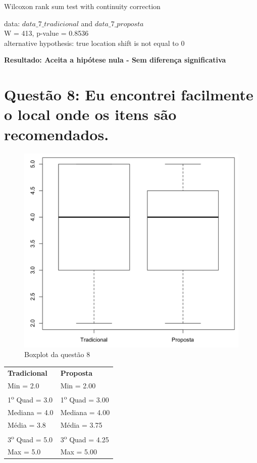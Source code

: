 Wilcoxon rank sum test with continuity correction

\noindent
data:  $data\_7\_tradicional$ and $data\_7\_proposta$\\
W = 413, p-value = 0.8536\\
alternative hypothesis: true location shift is not equal to 0

\noindent
\textbf{Resultado: Aceita a hipótese nula - Sem diferença significativa}

\newpage
\section{Questão 8: Eu encontrei facilmente o local onde os itens são recomendados.}

\begin{figure}[htb]
  \caption{\label{fig:questao8-boxplot}Boxplot da questão 8}
  \begin{center}
      \includegraphics[scale=0.4]{./Figuras/questao8-boxplot.png}
  \end{center}
\end{figure}

\begin{table}[h]
\begin{tabular}{p{}p{}}
\textbf{Tradicional} & \textbf{Proposta} \\
Min = 2.0 & Min = 2.00\\
1\textsuperscript{o} Quad = 3.0 & 1\textsuperscript{o} Quad = 3.00\\
Mediana = 4.0 & Mediana = 4.00\\
Média = 3.8 & Média = 3.75\\
3\textsuperscript{o} Quad = 5.0 & 3\textsuperscript{o} Quad = 4.25\\
Max = 5.0 & Max = 5.00\\
\end{tabular}
\end{table}

